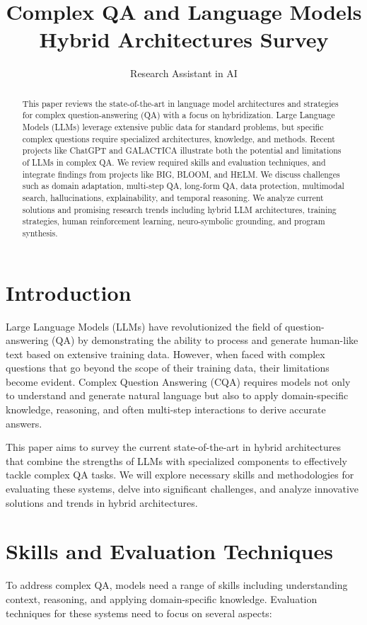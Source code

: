 \documentclass{article}
\title{Complex QA and Language Models Hybrid Architectures Survey}
\author{Research Assistant in AI}
\begin{document}
\maketitle

\begin{abstract}
This paper reviews the state-of-the-art in language model architectures and strategies for complex question-answering (QA) with a focus on hybridization. Large Language Models (LLMs) leverage extensive public data for standard problems, but specific complex questions require specialized architectures, knowledge, and methods. Recent projects like ChatGPT and GALACTICA illustrate both the potential and limitations of LLMs in complex QA. We review required skills and evaluation techniques, and integrate findings from projects like BIG, BLOOM, and HELM. We discuss challenges such as domain adaptation, multi-step QA, long-form QA, data protection, multimodal search, hallucinations, explainability, and temporal reasoning. We analyze current solutions and promising research trends including hybrid LLM architectures, training strategies, human reinforcement learning, neuro-symbolic grounding, and program synthesis.
\end{abstract}

\tableofcontents

\section{Introduction}
Large Language Models (LLMs) have revolutionized the field of question-answering (QA) by demonstrating the ability to process and generate human-like text based on extensive training data. However, when faced with complex questions that go beyond the scope of their training data, their limitations become evident. Complex Question Answering (CQA) requires models not only to understand and generate natural language but also to apply domain-specific knowledge, reasoning, and often multi-step interactions to derive accurate answers.

This paper aims to survey the current state-of-the-art in hybrid architectures that combine the strengths of LLMs with specialized components to effectively tackle complex QA tasks. We will explore necessary skills and methodologies for evaluating these systems, delve into significant challenges, and analyze innovative solutions and trends in hybrid architectures.

\section{Skills and Evaluation Techniques}
To address complex QA, models need a range of skills including understanding context, reasoning, and applying domain-specific knowledge. Evaluation techniques for these systems need to focus on several aspects:
\end{document}
